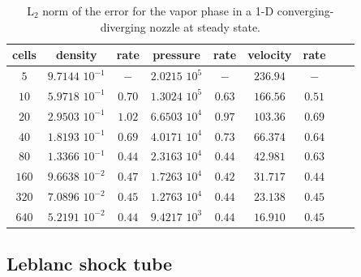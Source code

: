 \begin{table}[H]
\begin{center}
 \caption{\label{tbl:l2_norm_vap} L$_2$ norm of the error for the vapor phase in a 1-D converging-diverging nozzle at steady state.}
 \begin{tabular}{|c|c|c|c|c|c|c|c|c|}
 \hline
cells & density             & rate      & pressure          & rate      & velocity & rate       \\ \hline
$5$   & $9.7144$ $10^{-1}$  & $-$       & $2.0215$ $10^{5}$ & $-$       & $236.94$ & $-$        \\ \hline
$10$  & $5.9718$ $10^{-1}$  & $0.70$ & $1.3024$ $10^{5}$ & $0.63$ & $166.56$ & $0.51$  \\ \hline
$20$  & $2.9503$ $10^{-1}$  & $1.02$  & $6.6503$ $10^{4}$ & $0.97$ & $103.36$ & $0.69$  \\ \hline
$40$  & $1.8193$ $10^{-1}$  & $0.69$ & $4.0171$ $10^{4}$ & $0.73$ & $66.374$ & $0.64$   \\ \hline
$80$  & $1.3366$ $10^{-1}$  & $0.44$ & $2.3163$ $10^{4}$ & $0.44$ & $42.981$ & $0.63$  \\ \hline
$160$ & $9.6638$ $10^{-2}$  & $0.47$ & $1.7263$ $10^{4}$ & $0.42$ & $31.717$ & $0.44$  \\ \hline
$320$ & $7.0896$ $10^{-2}$  & $0.45$ & $1.2763$ $10^{4}$ & $0.44$ & $23.138$ & $0.45$  \\ \hline
$640$ & $5.2191$ $10^{-2}$  & $0.44$ & $9.4217$ $10^{3}$ & $0.44$ & $16.910$ & $0.45$  \\ \hline
\end{tabular}
\end{center}
\nonumber
\end{table}

\subsection{Leblanc shock tube} \label{sec:Leblanc}

